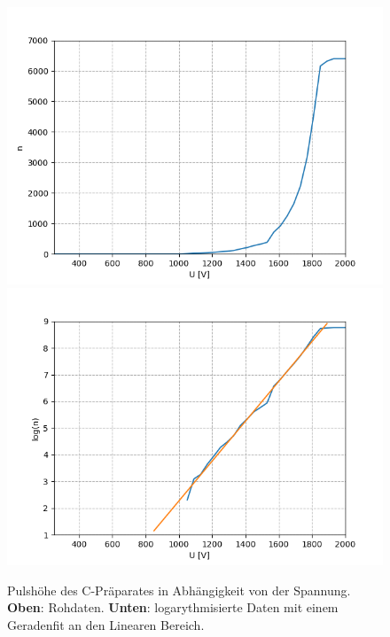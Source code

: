 \documentclass[12pt,a4paper]{article}
\begin{document}
\begin{figure}
\centering
\includegraphics[scale=0.8]{Bilder/Prop/C_Puls_lin.PNG}
\includegraphics[scale=0.8]{Bilder/Prop/C_Puls_exp.PNG}
\caption{Pulshöhe des C-Präparates in Abhängigkeit von der Spannung. \textbf{Oben}: Rohdaten. \textbf{Unten}: logarythmisierte Daten mit einem Geradenfit an den Linearen Bereich.}
\label{fig:CPulse}
\end{figure}
\end{document}
